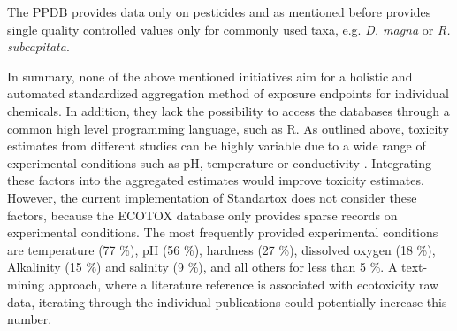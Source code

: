 The PPDB provides data only on pesticides and as mentioned before provides single quality controlled values only for commonly used taxa, e.g. \textit{D. magna} or \textit{R. subcapitata}.

In summary, none of the above mentioned initiatives aim for a holistic and automated standardized aggregation method of exposure endpoints for individual chemicals. In addition, they lack the possibility to access the databases through a common high level programming language, such as R. As outlined above, toxicity estimates from different studies can be highly variable due to a wide range of experimental conditions such as pH, temperature or conductivity \citep{rosenkrantz_influence_2013, li_temperature_2011}. Integrating these factors into the aggregated estimates would improve toxicity estimates. However, the current implementation of Standartox does not consider these factors, because the ECOTOX database only provides sparse records on experimental conditions. The most frequently provided experimental conditions are temperature (77 \%), pH (56 \%), hardness (27 \%), dissolved oxygen (18 \%), Alkalinity (15 \%) and salinity (9 \%), and all others for less than 5 \%. A text-mining approach, where a literature reference is associated with  ecotoxicity raw data, iterating through the individual publications could potentially increase this number.









